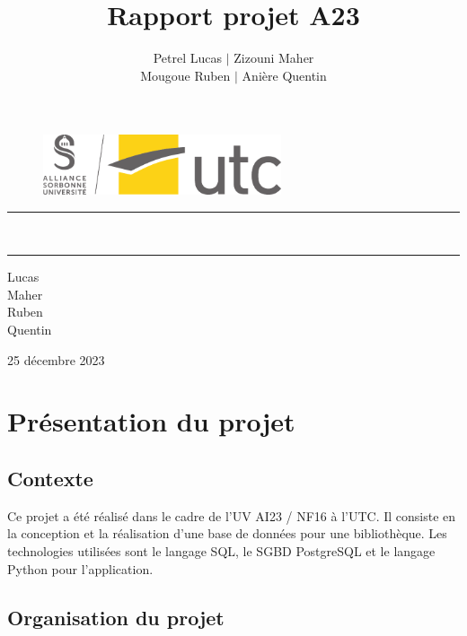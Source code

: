 \documentclass{report-UTC}
\title{Rapport projet A23}
\author{{\sc Petrel} Lucas $|$ {\sc Zizouni} Maher \\ {\sc Mougoue} Ruben $|$ {\sc Anière} Quentin}
\begin{document}
\thispagestyle{empty}
\setcounter{page}{0}

\begin{figure}[H]
\centering
\includegraphics[width=7cm]{./logo_utc.pdf}
\end{figure}

\vspace{3cm}

\begin{center}

{\color{jauneUTC}\rule{\linewidth}{0.8mm}}
\vspace*{0mm}

\Huge{\textbf{\theUV \\ \thetitle}}
{\color{jauneUTC}\rule{\linewidth}{0.8mm}}

\vspace{0.5cm}
\Large{
     Lucas \\
     Maher \\
     Ruben \\
     Quentin
} \\

\vspace{7cm}

\Large{25 décembre 2023}
\end{center}
 
\vspace{3cm}

\pagebreak

\tableofcontents{}

\pagebreak

\section{Présentation du projet}
\subsection{Contexte}

Ce projet a été réalisé dans le cadre de l'UV AI23 / NF16 à l'UTC. Il 
consiste en la conception et la réalisation d'une base de données pour
une bibliothèque. Les technologies utilisées sont le langage SQL, le SGBD
PostgreSQL et le langage Python pour l'application.

\subsection{Organisation du projet}
\end{document}
